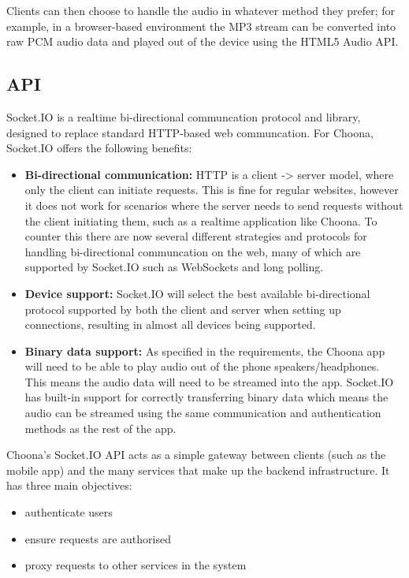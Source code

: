 Clients can then choose to handle the audio in whatever method they prefer; for example, in a browser-based environment the MP3 stream can be converted into raw PCM audio data and played out of the device using the HTML5 Audio API.


\subsection{API}

Socket.IO is a realtime bi-directional communcation protocol and library, designed to replace standard HTTP-based web communcation. For Choona, Socket.IO offers the following benefits:

\begin{itemize}
  \item \textbf{Bi-directional communication:} HTTP is a client -> server model, where only the client can initiate requests. This is fine for regular websites, however it does not work for scenarios where the server needs to send requests without the client initiating them, such as a realtime application like Choona. To counter this there are now several different strategies and protocols for handling bi-directional communcation on the web, many of which are supported by Socket.IO such as WebSockets and long polling.
  \item \textbf{Device support:} Socket.IO will select the best available bi-directional protocol supported by both the client and server when setting up connections, resulting in almost all devices being supported.
  \item \textbf{Binary data support:} As specified in the requirements, the Choona app will need to be able to play audio out of the phone speakers/headphones. This means the audio data will need to be streamed into the app. Socket.IO has built-in support for correctly transferring binary data which means the audio can be streamed using the same communication and authentication methods as the rest of the app.
\end{itemize}

Choona's Socket.IO API acts as a simple gateway between clients (such as the mobile app) and the many services that make up the backend infrastructure. It has three main objectives:

\begin{itemize}
  \item authenticate users
  \item ensure requests are authorised
  \item proxy requests to other services in the system
\end{itemize}

